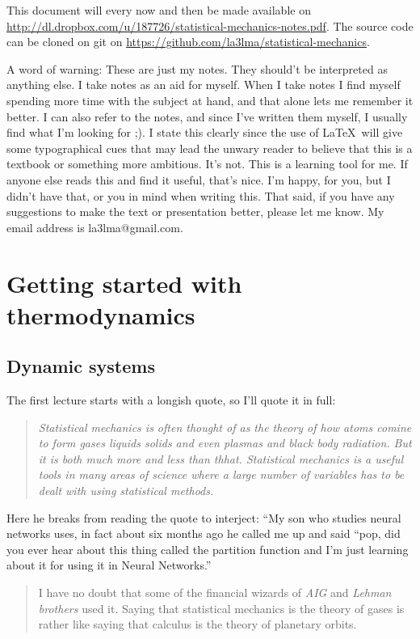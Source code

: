 \documentclass[a4, 12pt, english, USenglish]{scrreprt}
\newcommand{\idx}[1]{{\em #1}\index{#1}}
\begin{document}
This document will every now and then be made available on
\url{http://dl.dropbox.com/u/187726/statistical-mechanics-notes.pdf}.   The
source code can be cloned on git on \url{https://github.com/la3lma/statistical-mechanics}.


A word of warning: These are just my notes.  They should't be
interpreted as anything else.  I take notes as an aid for myself.
When I take notes I find myself spending more time with the subject at
hand, and that alone lets me remember it better.  I can also refer to
the notes, and since I've written them myself, I usually find  what
I'm looking for ;).   I state this clearly since the use of \LaTeX\ will
give some typographical cues that may lead the unwary reader to
believe that this is a textbook or something more ambitious.  It's
not.  This is a learning tool for me.  If anyone else reads this and
find it useful, that's nice. I'm happy,  for you, but I didn't have
that, or you in mind when writing this.   That said, if you have any
suggestions to make the text or presentation better, please let me
know.  My email address is la3lma@gmail.com.

\chapter{Getting started with thermodynamics}


\section{Dynamic systems}

The first lecture starts with a longish quote, so I'll quote it in
full:

\begin{quote}\it
Statistical mechanics is often thought of as the theory of how atoms
comine to form gases liquids solids and even plasmas and black body
radiation.   But it is both much more and less than thhat.
Statistical mechanics is a useful tools in many areas of science where
a large number of variables has to be dealt with using statistical
methods.
\end{quote}


Here he breaks from reading the quote to interject: ``My son who
studies neural networks uses, in fact about six months ago he called
me up and said ``pop, did you ever hear about this thing called the
partition function and I'm just learning about it for using it in
Neural Networks.''

\begin{quote} \it

I have no doubt that some of the financial wizards of \idx{AIG} and \idx{Lehman
brothers} used it.  Saying that statistical mechanics is the theory of
gases is rather like saying that calculus is the theory of planetary orbits.

\end{quote}
\end{document}
